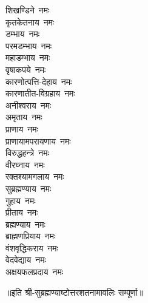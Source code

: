 \begin{multicols}{2}
\begin{flushleft}
शिखण्डिने~नमः\\
कृतकेतनाय~नमः\\
डम्भाय~नमः\\
परमडम्भाय~नमः\\
महाडम्भाय~नमः\hfill{}\\
वृषाकपये~नमः\\
कारणोत्पत्ति-देहाय~नमः\\
कारणातीत-विग्रहाय~नमः\\
अनीश्वराय~नमः\\
अमृताय~नमः\\
प्राणाय~नमः\\
प्राणायामपरायणाय~नमः\\
विरुद्धहन्त्रे~नमः\\
वीरघ्नाय~नमः\\
रक्तश्यामगलाय~नमः\hfill{}\\
सुब्रह्मण्याय~नमः\\
गुहाय~नमः\\
प्रीताय~नमः\\
ब्रह्मण्याय~नमः\\
ब्राह्मणप्रियाय~नमः\\
वंशवृद्धिकराय~नमः\\
वेदवेद्याय~नमः\\
अक्षयफलप्रदाय~नमः\\
\end{flushleft}
\end{multicols}

॥इति श्री-सुब्रह्मण्याष्टोत्तरशतनामावलिः सम्पूर्णा॥